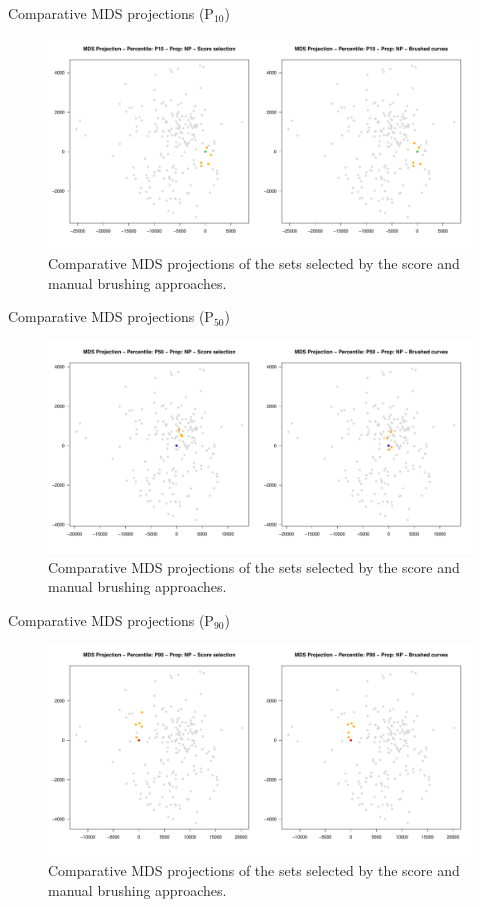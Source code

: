 \documentclass{beamer}
\begin{document}
\begin{frame}{Comparative MDS projections (P$_{10}$)}
  \begin{figure}[H]
    \centering
    \includegraphics[width=0.9\columnwidth]{figures/mds-brush-score-p10.pdf}
    \caption{Comparative MDS projections of the sets selected by the score and manual brushing approaches.}
    \label{fig:mds-plots}
  \end{figure}
\end{frame}

\begin{frame}{Comparative MDS projections (P$_{50}$)}
  \begin{figure}[H]
    \centering
    \includegraphics[width=0.9\columnwidth]{figures/mds-brush-score-p50.pdf}
    \caption{Comparative MDS projections of the sets selected by the score and manual brushing approaches.}
    \label{fig:mds-plots}
  \end{figure}
\end{frame}

\begin{frame}{Comparative MDS projections (P$_{90}$)}
  \begin{figure}[H]
    \centering
    \includegraphics[width=0.9\columnwidth]{figures/mds-brush-score-p90.pdf}
    \caption{Comparative MDS projections of the sets selected by the score and manual brushing approaches.}
    \label{fig:mds-plots}
  \end{figure}
\end{frame}
\end{document}
